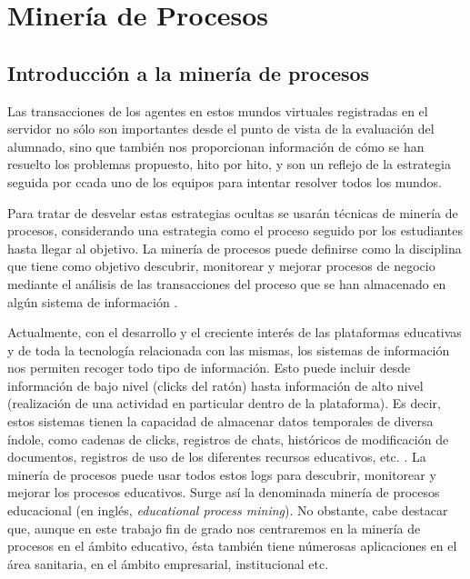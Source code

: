\chapter{Minería de Procesos}

\section{Introducción a la minería de procesos}

Las transacciones de los agentes en estos mundos virtuales registradas en el servidor no sólo son importantes desde el punto de vista de la evaluación del alumnado, sino que también nos proporcionan información de cómo se han resuelto los problemas propuesto, hito por hito, y son un reflejo de la estrategia seguida por ccada uno de los equipos para intentar resolver todos los mundos.

Para tratar de desvelar estas estrategias ocultas se usarán técnicas de minería de procesos, considerando una estrategia como el proceso seguido por los estudiantes hasta llegar al objetivo. La minería de procesos puede definirse como la disciplina que tiene como objetivo descubrir, monitorear y mejorar procesos de negocio mediante el análisis de las transacciones del proceso que se han almacenado en algún sistema de información \citep{Mayorga_2015}.

Actualmente, con el desarrollo y el creciente interés de las plataformas educativas y de toda la tecnología relacionada con las mismas, los sistemas de información nos permiten recoger todo tipo de información. Esto puede incluir desde información de bajo nivel (clicks del ratón) hasta información de alto nivel (realización de una actividad en particular dentro de la plataforma). Es decir, estos sistemas tienen la capacidad de almacenar datos temporales de diversa índole, como cadenas de clicks, registros de chats, históricos de modificación de documentos, registros de uso de los diferentes recursos educativos, etc. \cite{Bogarin_2017}. La minería de procesos puede usar todos estos logs para descubrir, monitorear y mejorar los procesos educativos. Surge así la denominada minería de procesos educacional (en inglés, \emph{educational process mining}). No obstante, cabe destacar que, aunque en este trabajo fin de grado nos centraremos en la minería de procesos en el ámbito educativo, ésta también tiene númerosas aplicaciones en el área sanitaria, en el ámbito empresarial, institucional etc.

